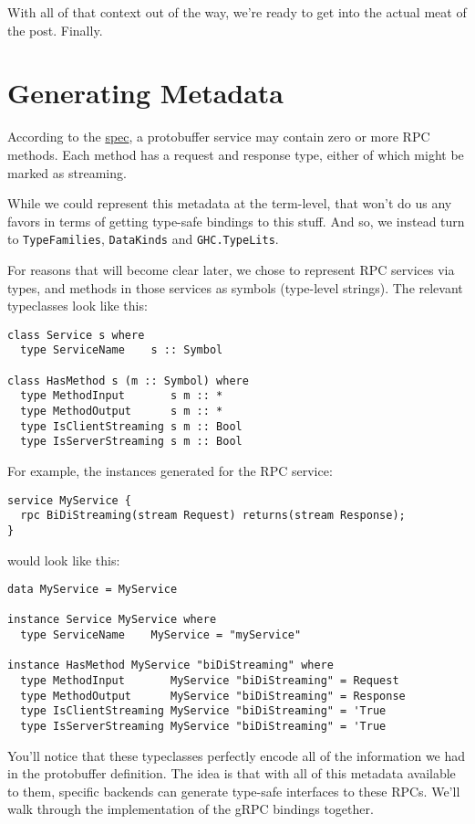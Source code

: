 With all of that context out of the way, we're ready to get into the actual meat of the post. Finally.


\section{Generating Metadata}

According to the \href{https://developers.google.com/protocol-buffers/docs/reference/proto3-spec}{spec}, a protobuffer service may contain zero or more RPC methods. Each method has a request and response type, either of which might be marked as streaming.

While we could represent this metadata at the term-level, that won't do us any favors in terms of getting type-safe bindings to this stuff. And so, we instead turn to \texttt{TypeFamilies}, \texttt{DataKinds} and \texttt{GHC.TypeLits}.

For reasons that will become clear later, we chose to represent RPC services via types, and methods in those services as symbols (type-level strings). The relevant typeclasses look like this:

\begin{verbatim}
class Service s where
  type ServiceName    s :: Symbol

class HasMethod s (m :: Symbol) where
  type MethodInput       s m :: *
  type MethodOutput      s m :: *
  type IsClientStreaming s m :: Bool
  type IsServerStreaming s m :: Bool
\end{verbatim}
For example, the instances generated for the RPC service:

\begin{verbatim}
service MyService {
  rpc BiDiStreaming(stream Request) returns(stream Response);
}
\end{verbatim}
would look like this:

\begin{verbatim}
data MyService = MyService

instance Service MyService where
  type ServiceName    MyService = "myService"

instance HasMethod MyService "biDiStreaming" where
  type MethodInput       MyService "biDiStreaming" = Request
  type MethodOutput      MyService "biDiStreaming" = Response
  type IsClientStreaming MyService "biDiStreaming" = 'True
  type IsServerStreaming MyService "biDiStreaming" = 'True
\end{verbatim}
You'll notice that these typeclasses perfectly encode all of the information we had in the protobuffer definition. The idea is that with all of this metadata available to them, specific backends can generate type-safe interfaces to these RPCs. We'll walk through the implementation of the gRPC bindings together.

